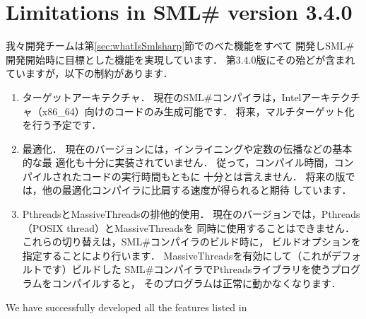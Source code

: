 \documentclass{jbook}
\newcommand{\txt}[2]{#2}
\newcommand{\smlsharp}{SML\#}
\newcommand{\version}{3.4.0}
\begin{document}
\section{
\txt{\smlsharp{}第\version{}版の機能と制限}
{Limitations in \smlsharp{} version \version{}}
}
\label{sec:smlsharpLimitation}

\ifjp%
	我々開発チームは第\ref{sec:whatIsSmlsharp}節でのべた機能をすべて
開発し\smlsharp{}開発開始時に目標とした機能を実現しています．
	第\version{}版にその殆どが含まれていますが，以下の制約があります．
\begin{enumerate}
\item ターゲットアーキテクチャ．
	現在の\smlsharp{}コンパイラは，Intelアーキテクチャ（x86\_64）向けのコードのみ生成可能です．
	将来，マルチターゲット化を行う予定です．

\item 最適化．
	現在のバージョンには，インライニングや定数の伝播などの基本的な最
適化も十分に実装されていません．
	従って，コンパイル時間，コンパイルされたコードの実行時間もともに
十分とは言えません．
	将来の版では，他の最適化コンパイラに比肩する速度が得られると期待
しています．

\item PthreadsとMassiveThreadsの排他的使用．
	現在のバージョンでは，Pthreads（POSIX thread）とMassiveThreadsを
同時に使用することはできません．
	これらの切り替えは，\smlsharp{}コンパイラのビルド時に，
ビルドオプションを指定することにより行います．
	MassiveThreadsを有効にして（これがデフォルトです）ビルドした
\smlsharp{}コンパイラでPthreadsライブラリを使うプログラムをコンパイルすると，
そのプログラムは正常に動かなくなります．

\end{enumerate}
\else%
	We have successfully developed all the features listed in
\end{document}
